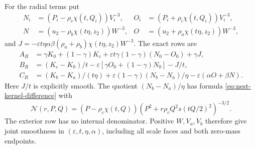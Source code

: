 \documentclass[11pt,a4paper]{article}
\numberwithin{equation}{section}
\theoremstyle{remark}
\newcommand{\eps}{\varepsilon}
\begin{document}
For the radial terms put
\[
 \begin{aligned}
 N_i&=(P_i-\rho_c\chi(t,Q_i))V_i^{-3},&
 O_i&=(P_i+\rho_i\chi(t,Q_i))V_i^{-3},\\
 N&=(u_2-\rho_b\chi(t\eta,z_2))W^{-3},&
 O&=(u_2+\rho_a\chi(t\eta,z_2))W^{-3},
 \end{aligned}
\]
and $J=-\eps t\eta\alpha\beta(\rho_a+\rho_b)\chi(t\eta,z_2)W^{-3}$. The exact rows are
\begin{equation}\label{eq:nest-radial}
 \begin{aligned}
 A_R&=\gamma K_0+(1-\gamma)K_c
       +\eps t\gamma(1-\gamma)(N_0-O_0)+\gamma J,\\
 B_R&=(K_c-K_0)/t-\eps[\gamma O_0+(1-\gamma)N_0]-J/t,\\
 C_R&=(K_b-K_a)/(t\eta)+\eps(1-\gamma)(N_b-N_a)/\eta
       -\eps(\alpha O+\beta N).
 \end{aligned}
\end{equation}
Here $J/t$ is explicitly smooth. The quotient $(N_b-N_a)/\eta$ has formula \eqref{eq:nest-kernel-difference} with
\[
 \mathcal N(r,P,Q)=(P-\rho_c\chi(t,Q))
 (P^2+r\rho_cQ^2s(tQ/2)^2)^{-3/2}.
\]
The exterior row has no internal denominator. Positive $W,V_a,V_b$ therefore give joint smoothness in $(\eps,t,\eta,\alpha)$, including all scale faces and both zero-mass endpoints.
\end{document}
